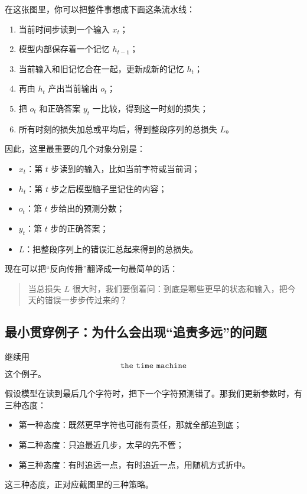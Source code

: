 \documentclass[12pt,a4paper]{ctexart}
\begin{document}
在这张图里，你可以把整件事想成下面这条流水线：
\begin{enumerate}
  \item 当前时间步读到一个输入 \(x_t\)；
  \item 模型内部保存着一个记忆 \(h_{t-1}\)；
  \item 当前输入和旧记忆合在一起，更新成新的记忆 \(h_t\)；
  \item 再由 \(h_t\) 产出当前输出 \(o_t\)；
  \item 把 \(o_t\) 和正确答案 \(y_t\) 一比较，得到这一时刻的损失；
  \item 所有时刻的损失加总或平均后，得到整段序列的总损失 \(L\)。
\end{enumerate}

因此，这里最重要的几个对象分别是：
\begin{itemize}
  \item \(x_t\)：第 \(t\) 步读到的输入，比如当前字符或当前词；
  \item \(h_t\)：第 \(t\) 步之后模型脑子里记住的内容；
  \item \(o_t\)：第 \(t\) 步给出的预测分数；
  \item \(y_t\)：第 \(t\) 步的正确答案；
  \item \(L\)：把整段序列上的错误汇总起来得到的总损失。
\end{itemize}

现在可以把“反向传播”翻译成一句最简单的话：
\begin{quote}
当总损失 \(L\) 很大时，我们要倒着问：到底是哪些更早的状态和输入，把今天的错误一步步传过来的？
\end{quote}

\subsection{最小贯穿例子：为什么会出现“追责多远”的问题}

继续用
\[
\texttt{the time machine}
\]
这个例子。

假设模型在读到最后几个字符时，把下一个字符预测错了。那我们更新参数时，有三种态度：
\begin{itemize}
  \item 第一种态度：既然更早字符也可能有责任，那就全部追到底；
  \item 第二种态度：只追最近几步，太早的先不管；
  \item 第三种态度：有时追远一点，有时追近一点，用随机方式折中。
\end{itemize}

这三种态度，正对应截图里的三种策略。
\end{document}
